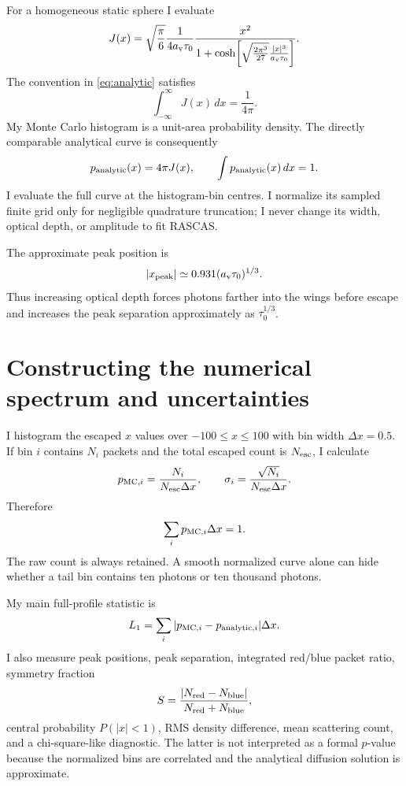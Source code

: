 \documentclass[11pt,a4paper]{article}
\newcommand{\tauzero}{\tau_0}
\newcommand{\av}{a_{\rm v}}
\begin{document}
For a homogeneous static sphere I evaluate
\begin{equation}
J(x)=\sqrt{\frac{\pi}{6}}\frac{1}{4\av\tauzero}
\frac{x^2}{1+\cosh\!\left[
\sqrt{\frac{2\pi^3}{27}}\frac{|x|^3}{\av\tauzero}
\right]}.
\label{eq:analytic}
\end{equation}
The convention in \ref{eq:analytic} satisfies
\[
\int_{-\infty}^{\infty}J(x)\,dx=\frac{1}{4\pi}.
\]
My Monte Carlo histogram is a unit-area probability density.  The directly
comparable analytical curve is consequently
\begin{equation}
p_{\rm analytic}(x)=4\pi J(x),\qquad
\int p_{\rm analytic}(x)\,dx=1.
\end{equation}
I evaluate the full curve at the histogram-bin centres.  I normalize its sampled
finite grid only for negligible quadrature truncation; I never change its width,
optical depth, or amplitude to fit RASCAS.

The approximate peak position is
\begin{equation}
|x_{\rm peak}|\simeq0.931(\av\tauzero)^{1/3}.
\label{eq:peak}
\end{equation}
Thus increasing optical depth forces photons farther into the wings before
escape and increases the peak separation approximately as $\tauzero^{1/3}$.

\section{Constructing the numerical spectrum and uncertainties}

I histogram the escaped $x$ values over $-100\le x\le100$ with bin width
$\Delta x=0.5$.  If bin $i$ contains $N_i$ packets and the total escaped count
is $N_{\rm esc}$, I calculate
\begin{equation}
p_{{\rm MC},i}=\frac{N_i}{N_{\rm esc}\Delta x},
\qquad
\sigma_i=\frac{\sqrt{N_i}}{N_{\rm esc}\Delta x}.
\label{eq:hist}
\end{equation}
Therefore
\[
\sum_i p_{{\rm MC},i}\Delta x=1.
\]
The raw count is always retained.  A smooth normalized curve alone can hide
whether a tail bin contains ten photons or ten thousand photons.

My main full-profile statistic is
\begin{equation}
L_1=\sum_i|p_{{\rm MC},i}-p_{{\rm analytic},i}|\Delta x.
\label{eq:l1}
\end{equation}
I also measure peak positions, peak separation, integrated red/blue packet
ratio, symmetry fraction
\[
S=\frac{|N_{\rm red}-N_{\rm blue}|}{N_{\rm red}+N_{\rm blue}},
\]
central probability $P(|x|<1)$, RMS density difference, mean scattering count,
and a chi-square-like diagnostic.  The latter is not interpreted as a formal
$p$-value because the normalized bins are correlated and the analytical
diffusion solution is approximate.
\end{document}
